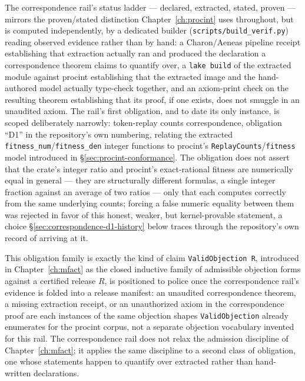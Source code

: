 The correspondence rail's status ladder --- declared, extracted, stated,
proven --- mirrors the proven/stated distinction Chapter~\ref{ch:procint}
uses throughout, but is computed independently, by a dedicated builder
(\texttt{scripts/build\_verif.py}) reading observed evidence rather than
by hand: a Charon/Aeneas pipeline receipt establishing that extraction
actually ran and produced the declaration a correspondence theorem
claims to quantify over, a \texttt{lake build} of the extracted module
against \textsf{procint} establishing that the extracted image and the
hand-authored model actually type-check together, and an axiom-print
check on the resulting theorem establishing that its proof, if one
exists, does not smuggle in an unaudited axiom. The rail's first
obligation, and to date its only instance, is scoped deliberately
narrowly: token-replay counts correspondence, obligation ``D1'' in the
repository's own numbering, relating the extracted
\texttt{fitness\_num}/\texttt{fitness\_den} integer functions to
\textsf{procint}'s \texttt{ReplayCounts}/\texttt{fitness} model
introduced in \S\ref{sec:procint-conformance}. The obligation does not
assert that the crate's integer ratio and \textsf{procint}'s exact-rational
fitness are numerically equal in general --- they are structurally
different formulas, a single integer fraction against an average of two
ratios --- only that each computes correctly from the same underlying
counts; forcing a false numeric equality between them was rejected in
favor of this honest, weaker, but kernel-provable statement, a choice
\S\ref{sec:correspondence-d1-history} below traces through the
repository's own record of arriving at it.

This obligation family is exactly the kind of claim
\texttt{ValidObjection R}, introduced in Chapter~\ref{ch:mfact} as the
closed inductive family of admissible objection forms against a
certified release \(R\), is positioned to police once the correspondence
rail's evidence is folded into a release manifest: an unaudited
correspondence theorem, a missing extraction receipt, or an unauthorized
axiom in the correspondence proof are each instances of the same
objection shapes \texttt{ValidObjection} already enumerates for the
\textsf{procint} corpus, not a separate objection vocabulary invented for
this rail. The correspondence rail does not relax the admission
discipline of Chapter~\ref{ch:mfact}; it applies the same discipline to a
second class of obligation, one whose statements happen to quantify over
extracted rather than hand-written declarations.

